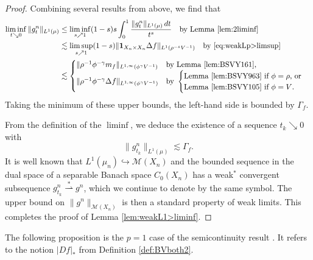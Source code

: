 \documentclass[11pt]{amsart}
\theoremstyle{definition}
\theoremstyle{remark}
\numberwithin{equation}{section}
\newcommand{\abs}[1]{|#1|}
\newcommand{\Norm}[2]{\|#1\|_{#2}}
\begin{document}
\begin{proof}
Combining several results from above, we find that
\begin{equation*}
\begin{split}
  \liminf_{t\searrow 0}\Norm{g^n_t}{L^1(\mu)}
  &\leq\liminf_{s\nearrow 1}(1-s)s\int_0^1\frac{\Norm{g^n_t}{L^1(\mu)}\, dt}{t^{s}}
  \quad\text{by Lemma \ref{lem:2liminf}} \\
&  \lesssim \limsup_{s\nearrow 1}(1-s)
   \Norm{ \mathbf{1}_{X_n\times X_n}\Delta f }{ L^1(\rho^{-s}V^{-1})}
  \quad\text{by \eqref{eq:weakLp>limsup}} \\
&\lesssim
\begin{cases} \Norm{\rho^{-1}\phi^{-\gamma}m_f}{L^{1,\infty}(\phi^\gamma V^{-1})} &
\text{by Lemma \ref{lem:BSVY161}}, \\
  \Norm{\rho^{-1}\phi^{-\gamma}\Delta f}{L^{1,\infty}(\phi^\gamma V^{-1})} &
  \text{by }
  \begin{cases} \text{Lemma \ref{lem:BSVY963} if $\phi=\rho$, or} \\
  \text{Lemma \ref{lem:BSVY105} if $\phi=V$}.\end{cases}
  \end{cases}
\end{split}
\end{equation*}
Taking the minimum of these upper bounds, the left-hand side is bounded by $\Gamma_f$.

From the definition of the $\liminf$, we deduce the existence of a sequence $t_k\searrow 0$ with
\begin{equation*}
   \Norm{g^n_{t_k}}{L^1(\mu)}
 \lesssim\Gamma_f.
\end{equation*}
It is well known that $L^1(\mu_n)\hookrightarrow \mathscr{M}(X_n)$ and
the bounded sequence in the dual space of a separable
Banach space $C_0(X_n)$ has a weak$^*$ convergent subsequence
$g^n_{t_k}\overset{*}{\rightharpoonup} g^n$, which we continue to denote by the same symbol.
The upper bound on $\Norm{g^n}{\mathscr{M}(X_n)}$ is then a standard property of weak
limits.
This completes the proof of Lemma \ref{lem:weakL1>liminf}.
\end{proof}

The following proposition is the $p=1$ case of the semicontinuity result \cite[Lemma
2.6]{DMS}. It refers to the notion $\abs{Df}_*$ from Definition \ref{def:BVboth2}.
\end{document}
